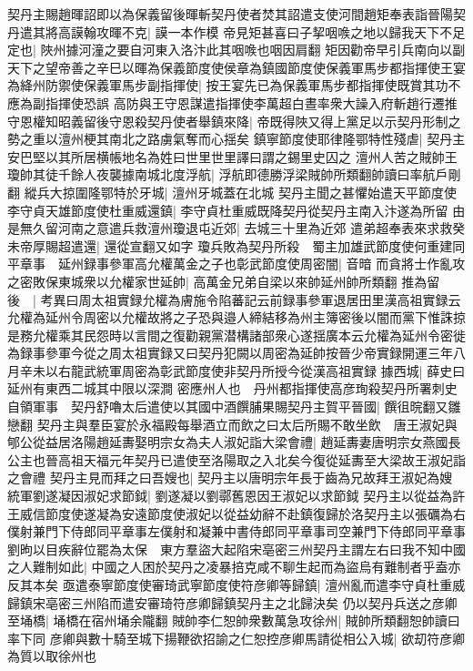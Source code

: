 契丹主賜趙暉詔即以為保義留後暉斬契丹使者焚其詔遣支使河間趙矩奉表詣晉陽契丹遣其將高謨翰攻暉不克|{
	謨一本作模}
帝見矩甚喜曰子挈咽㗋之地以歸我天下不足定也|{
	陜州據河潼之要自河東入洛汴此其咽㗋也咽因肩翻}
矩因勸帝早引兵南向以副天下之望帝善之辛巳以暉為保義節度使侯章為鎮國節度使保義軍馬步都指揮使王宴為絳州防禦使保義軍馬步副指揮使|{
	按王宴先已為保義軍馬步都指揮使既賞其功不應為副指揮使恐誤}
高防與王守恩謀遣指揮使李萬超白晝率衆大譟入府斬趙行遷推守恩權知昭義留後守恩殺契丹使者舉鎮來降|{
	帝既得陜又得上黨足以示契丹形制之勢之重以澶州梗其南北之路虜氣奪而心揺矣}
鎮寧節度使耶律隆鄂特性殘虐|{
	契丹主安巴堅以其所居横帳地名為姓曰世里世里譯曰謂之錫里史囚之}
澶州人苦之賊帥王瓊帥其徒千餘人夜襲據南城北度浮航|{
	浮航即德勝浮梁賊帥所類翻帥讀曰率航戶剛翻}
縱兵大掠圍隆鄂特於牙城|{
	澶州牙城蓋在北城}
契丹主聞之甚懼始遣天平節度使李守貞天雄節度使杜重威還鎮|{
	李守貞杜重威既降契丹從契丹主南入汴遂為所留}
由是無久留河南之意遣兵救澶州瓊退屯近郊|{
	去城三十里為近郊}
遣弟超奉表來求救癸未帝厚賜超遣還|{
	還從宣翻又如字}
瓊兵敗為契丹所殺　蜀主加雄武節度使何重建同平章事　延州録事參軍高允權萬金之子也彰武節度使周密闇|{
	音暗}
而貪將士作亂攻之密敗保東城衆以允權家世延帥|{
	高萬金兄弟自梁以來帥延州帥所類翻}
推為留後　|{
	考異曰周太祖實録允權為膚施令陷蕃記云前録事參軍退居田里漢高祖實録云允權為延州令周密以允權故將之子恐與邉人締結移為州主簿密後以闇而黨下惟誅掠是務允權乘其民怨時以言間之復勸親黨潜構諸部衆心遂揺廣本云允權為延州令密徙為録事參軍今從之周太祖實録又曰契丹犯闕以周密為延帥按晉少帝實録開運三年八月辛未以右龍武統軍周密為彰武節度使非契丹所授今從漢高祖實録}
據西城|{
	薛史曰延州有東西二城其中限以深澗}
密應州人也　丹州都指揮使高彦珣殺契丹所署刺史自領軍事　契丹舒嚕太后遣使以其國中酒饌脯果賜契丹主賀平晉國|{
	饌徂晥翻又雛戀翻}
契丹主與羣臣宴於永福殿每舉酒立而飲之曰太后所賜不敢坐飲　唐王淑妃與郇公從益居洛陽趙延夀娶明宗女為夫人淑妃詣大梁會禮|{
	趙延夀妻唐明宗女燕國長公主也晉高祖天福元年契丹已遣使至洛陽取之入北矣今復從延夀至大梁故王淑妃詣之會禮}
契丹主見而拜之曰吾嫂也|{
	契丹主以唐明宗年長于齒為兄故拜王淑妃為嫂}
統軍劉遂凝因淑妃求節鉞|{
	劉遂凝以劉鄩舊恩因王淑妃以求節鉞}
契丹主以從益為許王威信節度使遂凝為安遠節度使淑妃以從益幼辭不赴鎮復歸於洛契丹主以張礪為右僕射兼門下侍郎同平章事左僕射和凝兼中書侍郎同平章事司空兼門下侍郎同平章事劉昫以目疾辭位罷為太保　東方羣盜大起陷宋亳密三州契丹主謂左右曰我不知中國之人難制如此|{
	中國之人困於契丹之凌暴掊克咸不聊生起而為盜烏有難制者乎盍亦反其本矣}
亟遣泰寧節度使審琦武寧節度使符彦卿等歸鎮|{
	澶州亂而遣李守貞杜重威歸鎮宋亳密三州陷而遣安審琦符彦卿歸鎮契丹主之北歸決矣}
仍以契丹兵送之彦卿至埇橋|{
	埇橋在宿州埇余隴翻}
賊帥李仁恕帥衆數萬急攻徐州|{
	賊帥所類翻恕帥讀曰率下同}
彦卿與數十騎至城下揚鞭欲招諭之仁恕控彦卿馬請從相公入城|{
	欲刧符彦卿為質以取徐州也}
